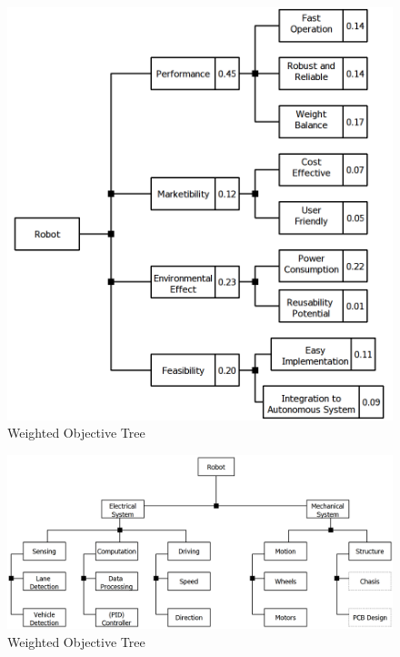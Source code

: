 \documentclass[a4paper,12pt]{article}
\begin{document}
	\begin{figure}[H]
		\centering
		\includegraphics[width=\textwidth,height=\textheight,keepaspectratio]{objective-tree/objective-tree} 
		\caption{\label{fig:product_tree}Weighted Objective Tree}
	\end{figure}
	
	
	\begin{figure}[H]
		\centering
		\includegraphics[width=\textwidth,height=\textheight,keepaspectratio]{product-tree/product-tree} 
		\caption{\label{fig:product_tree}Weighted Objective Tree}
	\end{figure}

	
\end{document}
